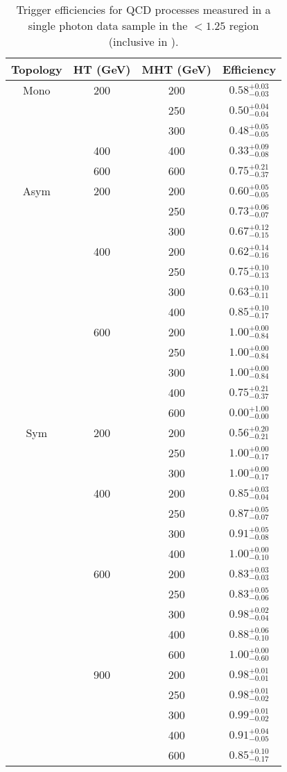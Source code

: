 \begin{table}[h!]
\tiny
\centering
\caption{Trigger efficiencies for QCD processes measured in a single photon
data sample in the \mhtmet$<1.25$ region (inclusive in \bdphi).}
\begin{tabular}{cccc}
\hline \hline
Topology & HT (GeV) & MHT (GeV) & Efficiency \\
\hline
\hline
Mono & 200 & 200 & $0.58^{+0.03}_{-0.03}$ \\
 &  & 250 & $0.50^{+0.04}_{-0.04}$ \\
 &  & 300 & $0.48^{+0.05}_{-0.05}$ \\
\hline
 & 400 & 400 & $0.33^{+0.09}_{-0.08}$ \\
\hline
 & 600 & 600 & $0.75^{+0.21}_{-0.37}$ \\
\hline
\hline
Asym & 200 & 200 & $0.60^{+0.05}_{-0.05}$ \\
 &  & 250 & $0.73^{+0.06}_{-0.07}$ \\
 &  & 300 & $0.67^{+0.12}_{-0.15}$ \\
\hline
 & 400 & 200 & $0.62^{+0.14}_{-0.16}$ \\
 &  & 250 & $0.75^{+0.10}_{-0.13}$ \\
 &  & 300 & $0.63^{+0.10}_{-0.11}$ \\
 &  & 400 & $0.85^{+0.10}_{-0.17}$ \\
\hline
 & 600 & 200 & $1.00^{+0.00}_{-0.84}$ \\
 &  & 250 & $1.00^{+0.00}_{-0.84}$ \\
 &  & 300 & $1.00^{+0.00}_{-0.84}$ \\
 &  & 400 & $0.75^{+0.21}_{-0.37}$ \\
 &  & 600 & $0.00^{+1.00}_{-0.00}$ \\
\hline
\hline
Sym & 200 & 200 & $0.56^{+0.20}_{-0.21}$ \\
 &  & 250 & $1.00^{+0.00}_{-0.17}$ \\
 &  & 300 & $1.00^{+0.00}_{-0.17}$ \\
\hline
 & 400 & 200 & $0.85^{+0.03}_{-0.04}$ \\
 &  & 250 & $0.87^{+0.05}_{-0.07}$ \\
 &  & 300 & $0.91^{+0.05}_{-0.08}$ \\
 &  & 400 & $1.00^{+0.00}_{-0.10}$ \\
\hline
 & 600 & 200 & $0.83^{+0.03}_{-0.03}$ \\
 &  & 250 & $0.83^{+0.05}_{-0.06}$ \\
 &  & 300 & $0.98^{+0.02}_{-0.04}$ \\
 &  & 400 & $0.88^{+0.06}_{-0.10}$ \\
 &  & 600 & $1.00^{+0.00}_{-0.60}$ \\
\hline
 & 900 & 200 & $0.98^{+0.01}_{-0.01}$ \\
 &  & 250 & $0.98^{+0.01}_{-0.02}$ \\
 &  & 300 & $0.99^{+0.01}_{-0.02}$ \\
 &  & 400 & $0.91^{+0.04}_{-0.05}$ \\
 &  & 600 & $0.85^{+0.10}_{-0.17}$ \\

\hline
\hline
\end{tabular}
\end{table}

